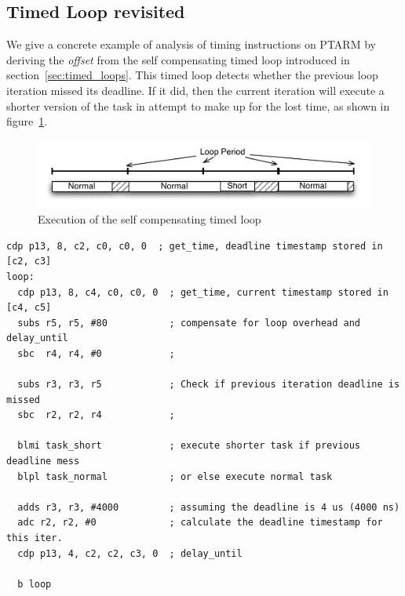 \subsection{Timed Loop revisited}
\label{sec:timed_loop_revisited}
We give a concrete example of analysis of timing instructions on PTARM by deriving the \emph{offset} from the self compensating timed loop introduced in section~\ref{sec:timed_loops}.
This timed loop detects whether the previous loop iteration missed its deadline. 
If it did, then the current iteration will execute a shorter version of the task in attempt to make up for the lost time, as shown in figure~\ref{fig:self_compensating_loop_timing}.  
\begin{figure}[h]
  \vspace{-3mm}
  \begin{center}
    \includegraphics[scale=.7]{figs/self_compensating_loop_timing}
  \end{center}
  \vspace{-3mm}
  \caption{Execution of the self compensating timed loop}
  \label{fig:self_compensating_loop_timing}
\end{figure}
\vspace{-8mm}
\begin{lstlisting}[float=h, label=lst:timed_loop_compensate_revisit,caption=Timed loops with compensation revisited]
  cdp p13, 8, c2, c0, c0, 0  ; get_time, deadline timestamp stored in [c2, c3]
loop:
  cdp p13, 8, c4, c0, c0, 0  ; get_time, current timestamp stored in [c4, c5]
  subs r5, r5, #80           ; compensate for loop overhead and delay_until 
  sbc  r4, r4, #0            ; 

  subs r3, r3, r5            ; Check if previous iteration deadline is missed
  sbc  r2, r2, r4            ; 

  blmi task_short            ; execute shorter task if previous deadline mess 
  blpl task_normal           ; or else execute normal task 
  
  adds r3, r3, #4000         ; assuming the deadline is 4 us (4000 ns)
  adc r2, r2, #0             ; calculate the deadline timestamp for this iter.
  cdp p13, 4, c2, c2, c3, 0  ; delay_until
   
  b loop
\end{lstlisting}

